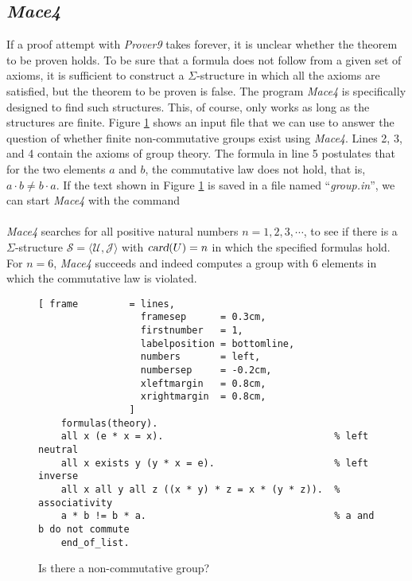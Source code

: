 \subsection{\textsl{Mace4} }
If a proof attempt with \textsl{Prover9} takes forever, it is unclear whether the theorem to be
proven holds. To be sure that a formula does not follow from a given set of axioms, it is sufficient to
construct a $\Sigma$-structure in which all the axioms are satisfied, but the theorem to be proven is false. The program
\textsl{Mace4} is specifically designed to find such structures. This, of course, only works as long as the
structures are finite. Figure \ref{fig:group.in} shows an input file that we can use to answer the question of
whether finite non-commutative groups exist using \textsl{Mace4}. Lines 2, 3, and 4 contain the axioms of group
theory. The formula in line 5 postulates that for the two elements $a$ and $b$, the commutative law does not
hold, that is, $a \cdot b \not= b \cdot a$. If the text shown in Figure \ref{fig:group.in} is saved in a file
named ``\textsl{group.in}'', we can start \textsl{Mace4} with the command 
\\[0.2cm]
\hspace*{1.3cm}
\\[0.2cm]
\textsl{Mace4} searches for all positive natural numbers $n=1,2,3,\cdots$, to see if there is a $\Sigma$-structure \linebreak
$\mathcal{S} = \langle \mathcal{U}, \mathcal{J} \rangle$ with $\textsl{card}(U) = n$ in which the specified
formulas hold. For $n=6$, \textsl{Mace4} succeeds and indeed computes a group with 6 elements in which the
commutative law is violated. 

\begin{figure}[!ht]
\centering
\begin{Verbatim}[ frame         = lines, 
                  framesep      = 0.3cm, 
                  firstnumber   = 1,
                  labelposition = bottomline,
                  numbers       = left,
                  numbersep     = -0.2cm,
                  xleftmargin   = 0.8cm,
                  xrightmargin  = 0.8cm,
                ]
    formulas(theory).
    all x (e * x = x).                              % left neutral
    all x exists y (y * x = e).                     % left inverse
    all x all y all z ((x * y) * z = x * (y * z)).  % associativity
    a * b != b * a.                                 % a and b do not commute
    end_of_list.
\end{Verbatim}
\vspace*{-0.3cm}
\caption{Is there a non-commutative group?}
\label{fig:group.in}
\end{figure}

